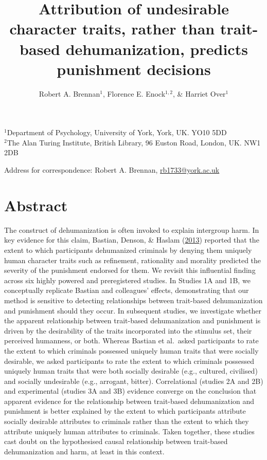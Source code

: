 \documentclass[
]{article}
\title{Attribution of undesirable character traits, rather than trait-based dehumanization, predicts punishment decisions}
\author{Robert A. Brennan\(^1\), Florence E. Enock\(^{1,2}\), \& Harriet Over\(^1\)}
\date{}
\begin{document}
\maketitle

\(^1\)Department of Psychology, University of York, York, UK. YO10 5DD\\
\(^2\)The Alan Turing Institute, British Library, 96 Euston Road, London, UK. NW1 2DB

Address for correspondence: Robert A. Brennan, \url{rb1733@york.ac.uk}

\hypertarget{abstract}{%
\section{Abstract}\label{abstract}}

The construct of dehumanization is often invoked to explain intergroup harm. In key evidence for this claim, Bastian, Denson, \& Haslam (\protect\hyperlink{ref-Bastian2013}{2013}) reported that the extent to which participants dehumanized criminals by denying them uniquely human character traits such as refinement, rationality and morality predicted the severity of the punishment endorsed for them. We revisit this influential finding across six highly powered and preregistered studies. In Studies 1A and 1B, we conceptually replicate Bastian and colleagues' effects, demonstrating that our method is sensitive to detecting relationships between trait-based dehumanization and punishment should they occur. In subsequent studies, we investigate whether the apparent relationship between trait-based dehumanization and punishment is driven by the desirability of the traits incorporated into the stimulus set, their perceived humanness, or both. Whereas Bastian et al.~asked participants to rate the extent to which criminals possessed uniquely human traits that were socially desirable, we asked participants to rate the extent to which criminals possessed uniquely human traits that were both socially desirable (e.g., cultured, civilised) and socially undesirable (e.g., arrogant, bitter). Correlational (studies 2A and 2B) and experimental (studies 3A and 3B) evidence converge on the conclusion that apparent evidence for the relationship between trait-based dehumanization and punishment is better explained by the extent to which participants attribute socially desirable attributes to criminals rather than the extent to which they attribute uniquely human attributes to criminals. Taken together, these studies cast doubt on the hypothesised causal relationship between trait-based dehumanization and harm, at least in this context.
\end{document}
